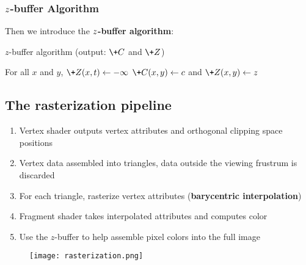 \subsubsection{$\*z$-buffer Algorithm}
Then we introduce the \textbf{$\*z$-buffer algorithm}:
\begin{algorithm}[htbp]
	\caption{$z$-buffer algorithm (output: $\+C$ and $\+Z$)}
	\begin{algorithmic}[1]
		\renewcommand{\algorithmicrequire}{\textbf{Input:}}
		\renewcommand{\algorithmicensure}{\textbf{Output:}}
		\renewcommand{\algorithmiccomment}[1]{\hfill\textit{\textcolor{blue}{\##1}}}
		\STATE For all $x$ and $y$, $\+Z(x,t)\gets-\infty$
		\STATE $\+C(x,y)\gets c$ and $\+Z(x,y)\gets z$
		\ENDIF
		\ENDFOR
	\end{algorithmic}
\end{algorithm}

\subsection{The rasterization pipeline}
\begin{enumerate}
	\item Vertex shader outputs vertex attributes and orthogonal clipping space positions
	\item Vertex data assembled into triangles, data outside the viewing frustrum is discarded
	\item For each triangle, rasterize vertex attributes (\textbf{barycentric interpolation})
	\item Fragment shader takes interpolated attributes and computes color
	\item Use the $z$-buffer to help assemble pixel colors into the full image
\end{enumerate}
\begin{figure}[H]
	\centering
	\texttt{[image: rasterization.png]}
	\label{fig:rasterization}
\end{figure}
